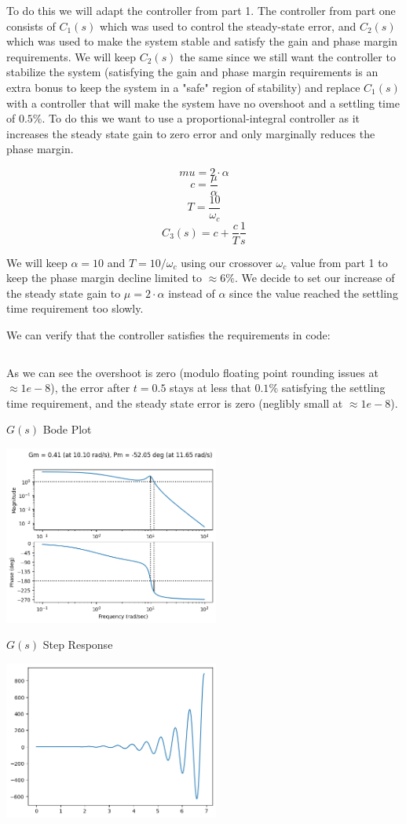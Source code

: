 \documentclass[11pt]{article}
\begin{document}
To do this we will adapt the controller from part 1. The controller from part one consists of $C_1(s)$ which was used to control the steady-state error, and $C_2(s)$ which was used to make the system stable and satisfy the gain and phase margin requirements. We will keep $C_2(s)$ the same since we still want the controller to stabilize the system (satisfying the gain and phase margin requirements is an extra bonus to keep the system in a "safe" region of stability) and replace $C_1(s)$ with a controller that will make the system have no overshoot and a settling time of $0.5\%$. To do this we want to use a proportional-integral controller as it increases the steady state gain to zero error and only marginally reduces the phase margin.

\[ mu = 2 \cdot \alpha \]
\[ c = \dfrac{\mu}{\alpha} \]
\[ T = \dfrac{10}{\omega_c} \]
\[ C_3(s) = c + \dfrac{c}{T} \dfrac{1}{s} \]

We will keep $\alpha = 10$ and $T = 10 / \omega_c$ using our crossover $\omega_c$ value from part 1 to keep the phase margin decline limited to $\approx 6\%$. We decide to set our increase of the steady state gain to $\mu = 2 \cdot \alpha$ instead of $\alpha$ since the value reached the settling time requirement too slowly.

We can verify that the controller satisfies the requirements in code:

\inputminted{python}{a4_2.py}

As we can see the overshoot is zero (modulo floating point rounding issues at $\approx 1e-8$), the error after $t = 0.5$ stays at less that $0.1\%$ satisfying the settling time requirement, and the steady state error is zero (neglibly small at $\approx 1e-8$).

$G(s)$ Bode Plot

\includegraphics[width=200pt]{a4_6.png}
  
$G(s)$ Step Response

\includegraphics[width=200pt]{a4_7.png}
\end{document}
